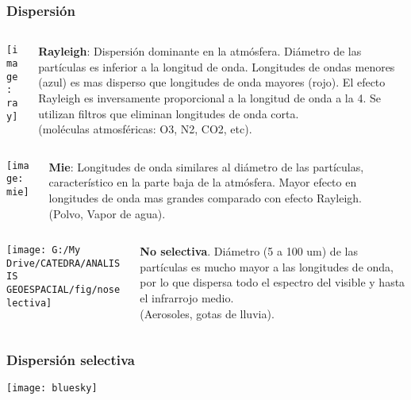 \documentclass[]{beamer}
\begin{document}
\begin{frame}
\frametitle{Dispersión}
  \begin{columns}
		\begin{column}{.3\linewidth}
		 \texttt{[image: ray]}
		\end{column}
		\begin{column}{.7\linewidth}
\scriptsize{\textbf{Rayleigh}: Dispersión dominante en la atmósfera. Diámetro de las partículas es inferior a la longitud de onda. Longitudes de ondas menores (azul) es mas disperso que longitudes de onda mayores (rojo). El efecto Rayleigh es inversamente proporcional a la longitud de onda a la 4. Se utilizan filtros que eliminan longitudes de onda corta.\\
(moléculas atmosféricas: O3, N2, CO2, etc)}.
		\end{column}
	\end{columns}
	\begin{columns}
		\begin{column}{.3\linewidth}
		 \texttt{[image: mie]}
		\end{column}
		\begin{column}{.7\linewidth}
\scriptsize{\textbf{Mie}: Longitudes de onda similares al diámetro de las partículas, característico en la parte baja de la atmósfera. Mayor efecto en longitudes de onda mas grandes comparado con efecto Rayleigh.\\
(Polvo, Vapor de agua).}
		\end{column}
	\end{columns}
	\begin{columns}
	 	\begin{column}{.3\linewidth}
		 \texttt{[image: G:/My Drive/CATEDRA/ANALISIS GEOESPACIAL/fig/noselectiva]}
		\end{column}
		\begin{column}{.7\linewidth}
\scriptsize{\textbf{No selectiva}. Diámetro (5  a 100 um) de las partículas es mucho mayor a las longitudes de onda, por lo que dispersa todo el espectro del visible y hasta el infrarrojo medio.\\
(Aerosoles, gotas de lluvia).}
		\end{column}
	\end{columns}
\end{frame}
\begin{frame}
\frametitle{Dispersión selectiva}
\begin{center} 
\texttt{[image: bluesky]}
\end{center}
\end{frame}
\end{document}
